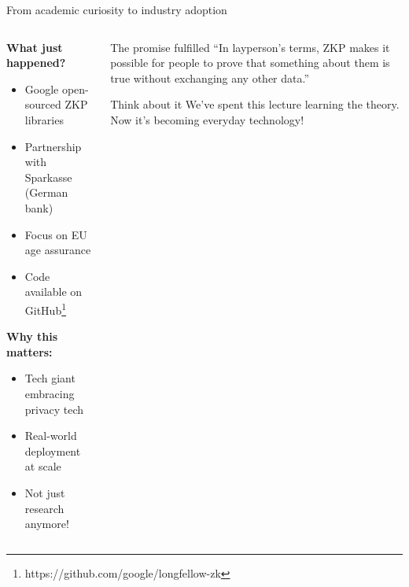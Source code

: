 \documentclass[aspectratio=169, lualatex, handout]{beamer}
\begin{document}
\begin{frame}{From academic curiosity to industry adoption}
	\begin{columns}[c]
		\begin{column}{0.5\textwidth}
			\textbf{What just happened?}
			\begin{itemize}
				\item Google open-sourced ZKP libraries
				\item Partnership with Sparkasse (German bank)
				\item Focus on EU age assurance
				\item Code available on GitHub\footnote{https://github.com/google/longfellow-zk}
			\end{itemize}
			\vspace{0.5em}
			\textbf{Why this matters:}
			\begin{itemize}
				\item Tech giant embracing privacy tech
				\item Real-world deployment at scale
				\item Not just research anymore!
			\end{itemize}
		\end{column}
		\begin{column}{0.5\textwidth}
			\begin{exampleblock}{The promise fulfilled}
				``In layperson's terms, ZKP makes it possible for people to prove that something about them is true without exchanging any other data.''
			\end{exampleblock}
			\vspace{0.5em}
			\begin{alertblock}{Think about it}
				We've spent this lecture learning the theory. Now it's becoming everyday technology!
			\end{alertblock}
		\end{column}
	\end{columns}
\end{frame}
\end{document}
